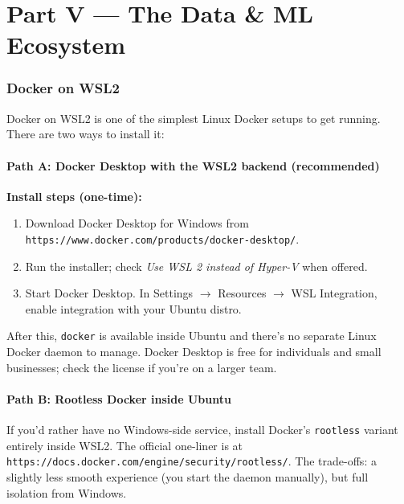 \documentclass[11pt,a4paper]{article}
\begin{document}
\clearpage
\part*{Part V --- The Data \& ML Ecosystem}

\section{Docker on WSL2}
\label{sec:docker}

Docker on WSL2 is one of the simplest Linux Docker setups to get
running. There are two ways to install it:

\subsection*{Path A: Docker Desktop with the WSL2 backend (recommended)}

\textbf{Install steps (one-time):}

\begin{enumerate}[leftmargin=*]
\item Download Docker Desktop for Windows from
\texttt{https://www.docker.com/products/docker-desktop/}.
\item Run the installer; check \emph{Use WSL 2 instead of Hyper-V}
when offered.
\item Start Docker Desktop. In Settings $\to$ Resources $\to$ WSL
Integration, enable integration with your Ubuntu distro.
\end{enumerate}

After this, \texttt{docker} is available inside Ubuntu and there's
no separate Linux Docker daemon to manage. Docker Desktop is free
for individuals and small businesses; check the license if
you're on a larger team.

\subsection*{Path B: Rootless Docker inside Ubuntu}

If you'd rather have no Windows-side service, install Docker's
\texttt{rootless} variant entirely inside WSL2. The official one-liner
is at \texttt{https://docs.docker.com/engine/security/rootless/}. The
trade-offs: a slightly less smooth experience (you start the
daemon manually), but full isolation from Windows.
\end{document}
